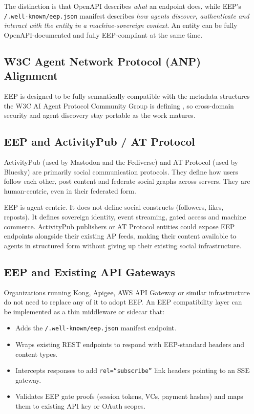 \documentclass[12pt,a4paper]{article}
\begin{document}
The distinction is that OpenAPI describes \textit{what} an endpoint does, while EEP's \nolinkurl{/.well-known/eep.json} manifest describes \textit{how agents discover, authenticate and interact with the entity in a machine-sovereign context}. An entity can be fully OpenAPI-documented and fully EEP-compliant at the same time.

\subsection{W3C Agent Network Protocol (ANP) Alignment}

EEP is designed to be fully semantically compatible with the metadata structures the W3C AI Agent Protocol Community Group is defining \cite{ref29}, so cross-domain security and agent discovery stay portable as the work matures.

\subsection{EEP and ActivityPub / AT Protocol}

ActivityPub (used by Mastodon and the Fediverse) and AT Protocol (used by Bluesky) are primarily social communication protocols. They define how users follow each other, post content and federate social graphs across servers. They are human-centric, even in their federated form.

EEP is agent-centric. It does not define social constructs (followers, likes, reposts). It defines sovereign identity, event streaming, gated access and machine commerce. ActivityPub publishers or AT Protocol entities could expose EEP endpoints alongside their existing AP feeds, making their content available to agents in structured form without giving up their existing social infrastructure.

\subsection{EEP and Existing API Gateways}

Organizations running Kong, Apigee, AWS API Gateway or similar infrastructure do not need to replace any of it to adopt EEP. An EEP compatibility layer can be implemented as a thin middleware or sidecar that:

\begin{itemize}
    \item Adds the \texttt{/.well-known/eep.json} manifest endpoint.
    \item Wraps existing REST endpoints to respond with EEP-standard headers and content types.
    \item Intercepts responses to add \texttt{rel=``subscribe''} link headers pointing to an SSE gateway.
    \item Validates EEP gate proofs (session tokens, VCs, payment hashes) and maps them to existing API key or OAuth scopes.
\end{itemize}
\end{document}
